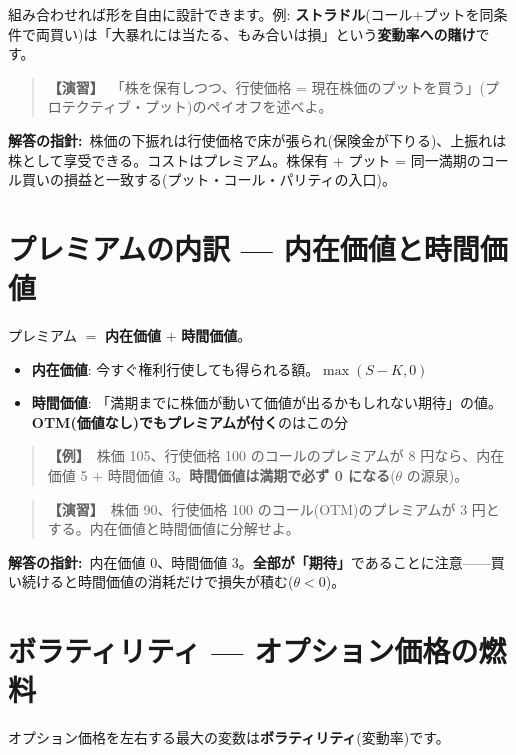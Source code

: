 \documentclass{article}
\begin{document}
組み合わせれば形を自由に設計できます。例: \textbf{ストラドル}(コール+プットを同条件で両買い)は「大暴れには当たる、もみ合いは損」という\textbf{変動率への賭け}です。

\begin{quote}
\textbf{【演習】}\ 「株を保有しつつ、行使価格 = 現在株価のプットを買う」(プロテクティブ・プット)のペイオフを述べよ。
\end{quote}

\textbf{解答の指針:}\ 株価の下振れは行使価格で床が張られ(保険金が下りる)、上振れは株として享受できる。コストはプレミアム。株保有 + プット = 同一満期のコール買いの損益と一致する(プット・コール・パリティの入口)。

\section{プレミアムの内訳 — 内在価値と時間価値}

プレミアム \(=\) \textbf{内在価値} \(+\) \textbf{時間価値}。

\begin{itemize}
\item \textbf{内在価値}: 今すぐ権利行使しても得られる額。\(\max(S - K, 0)\)
\item \textbf{時間価値}: 「満期までに株価が動いて価値が出るかもしれない期待」の値。\textbf{OTM(価値なし)でもプレミアムが付く}のはこの分
\end{itemize}

\begin{quote}
\textbf{【例】}\ 株価 105、行使価格 100 のコールのプレミアムが 8 円なら、内在価値 5 + 時間価値 3。\textbf{時間価値は満期で必ず 0 になる}(\( \theta \) の源泉)。
\end{quote}

\begin{quote}
\textbf{【演習】}\ 株価 90、行使価格 100 のコール(OTM)のプレミアムが 3 円とする。内在価値と時間価値に分解せよ。
\end{quote}

\textbf{解答の指針:}\ 内在価値 0、時間価値 3。\textbf{全部が「期待」}であることに注意——買い続けると時間価値の消耗だけで損失が積む(\( \theta < 0 \))。

\section{ボラティリティ — オプション価格の燃料}

オプション価格を左右する最大の変数は\textbf{ボラティリティ}(変動率)です。
\end{document}
